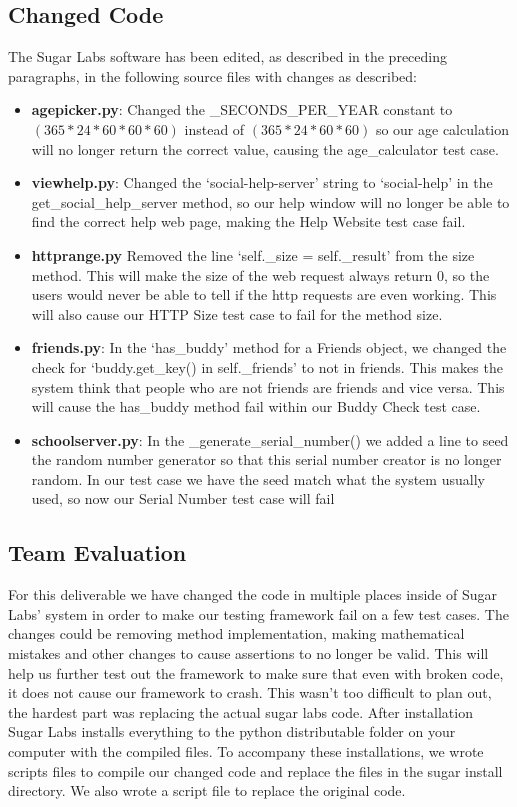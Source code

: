 \documentclass{article}
\begin{document}
\subsection{Changed Code}
The Sugar Labs software has been edited, as described in the preceding paragraphs, in the following source files with changes as described:
\begin{itemize}[noitemsep,topsep=0pt]
\item \textbf{agepicker.py}: Changed the \_SECONDS\_PER\_YEAR constant to $(365 * 24 * 60 * 60 * 60)$ instead of $(365 * 24 * 60 * 60)$ so our age calculation will no longer return the correct value, causing the age\_calculator test case.
\item \textbf{viewhelp.py}: Changed the ‘social-help-server’ string to ‘social-help’ in the get\_social\_help\_server method, so our help window will no longer be able to find the correct help web page, making the Help Website test case fail.
\item \textbf{httprange.py} Removed the line ‘self.\_size = self.\_result’ from the size method. This will make the size of the web request always return 0, so the users would never be able to tell if the http requests are even working. This will also cause our HTTP Size test case to fail for the method size.
\item \textbf{friends.py}: In the ‘has\_buddy’ method for a Friends object, we changed the check for ‘buddy.get\_key() in self.\_friends’ to not in friends. This makes the system think that people who are not friends are friends and vice versa. This will cause the has\_buddy method fail within our Buddy Check test case.
\item \textbf{schoolserver.py}: In the \_generate\_serial\_number() we added a line to seed the random number generator so that this serial number creator is no longer random. In our test case we have the seed match what the system usually used, so now our Serial Number test case will fail
\end{itemize}
\subsection{Team Evaluation}
For this deliverable we have changed the code in multiple places inside of Sugar Labs’ system in order to make our testing framework fail on a few test cases. The changes could be removing method implementation, making mathematical mistakes and other changes to cause assertions to no longer be valid. This will help us further test out the framework to make sure that even with broken code, it does not cause our framework to crash. This wasn't too difficult to plan out, the hardest part was replacing the actual sugar labs code. After installation Sugar Labs installs everything to the python distributable folder on your computer with the compiled files. To accompany these installations, we wrote scripts files to compile our changed code and replace the files in the sugar install directory. We also wrote a script file to replace the original code.
\end{document}
